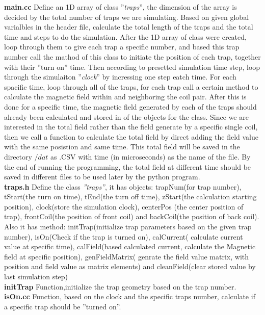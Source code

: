 \documentclass[11pt, xcolor=dvipsnames]{article}
\begin{document}
\textbf{main.cc} Define an 1D array of class ''\textit{traps}'', the dimension of the array is decided by the total number of traps we are simulating. Based on given global varialbles in the header file, calculate the total length of the traps and the total time and steps to do the simulation. After the 1D array of class were created, loop through them to give each trap a specific number, and based this trap number call the mathod of this class to initiate the position of each trap, together with their ''turn on'' time. Then according to presetted simulation time step, loop through the simulaiton ''\textit{clock}'' by incressing one step eatch time.  For each spacific time, loop through all of the traps, for each trap call a certain method to calculate the magnetic field within and neighboring the coil pair. After this is done for a specific time, the magnetic field generated by each of the traps should already been calculated and stored in of the objects for the class. Since we are interested in the total field rather than the field generate by a specific single coil, then we call a function to calculate the total field by direct adding the field value with the same posistion and same time. This total field will be saved in the directory $/dat$ as .CSV with time (in microseconds) as the name of the file. By the end of running the programming, the total field at different time should be saved in different files to be used later by the python program. \\

\textbf{traps.h} Define the class \textit{''traps''}, it has objects: trapNum(for trap number), tStart(the turn on time), tEnd(the turn off time), zStart(the calculation starting position), clock(store the simulation clock), centerPos (the center position of trap), frontCoil(the position of front coil) and backCoil(the position of back coil). Also it has method: initTrap(initialize trap parameters based on the given trap number), isOn(Check if the trap is turned on), calCurrent( calculate current value at specific time), calField(based calculated current, calculate the Magnetic field at specific position), genFieldMatrix( genrate the field value matrix, with position and field value as matrix elements) and cleanField(clear stored value by last simulation step)\\

\textbf{initTrap} Function,initialize the trap geometry based on the trap number.\\

\textbf{isOn.cc} Function, based on the clock and the specific traps number, calculate if a specific trap should be ''turned on''. \\
\end{document}
